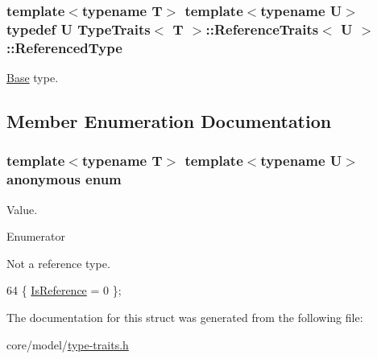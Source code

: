 \subsubsection[{\texorpdfstring{Referenced\+Type}{ReferencedType}}]{\setlength{\rightskip}{0pt plus 5cm}template$<$typename T$>$ template$<$typename U$>$ typedef U {\bf Type\+Traits}$<$ T $>$\+::{\bf Reference\+Traits}$<$ U $>$\+::{\bf Referenced\+Type}}\hypertarget{structTypeTraits_1_1ReferenceTraits_a163b9c89cfaba740659697cc1d1fea22}{}\label{structTypeTraits_1_1ReferenceTraits_a163b9c89cfaba740659697cc1d1fea22}
\hyperlink{structTypeTraits_1_1Base}{Base} type. 

\subsection{Member Enumeration Documentation}
\subsubsection[{\texorpdfstring{anonymous enum}{anonymous enum}}]{\setlength{\rightskip}{0pt plus 5cm}template$<$typename T$>$ template$<$typename U$>$ anonymous enum}\hypertarget{structTypeTraits_1_1ReferenceTraits_a2ca079e379bf0e0a66c93a97e9f4097d}{}\label{structTypeTraits_1_1ReferenceTraits_a2ca079e379bf0e0a66c93a97e9f4097d}
Value. \begin{Desc}
\item[Enumerator]\par
\begin{description}
\item[{\em 
Is\+Reference\hypertarget{structTypeTraits_1_1ReferenceTraits_a2ca079e379bf0e0a66c93a97e9f4097da833081f071bb2e66b80dee63c1611d26}{}\label{structTypeTraits_1_1ReferenceTraits_a2ca079e379bf0e0a66c93a97e9f4097da833081f071bb2e66b80dee63c1611d26}
}]Not a reference type. \end{description}
\end{Desc}

\begin{DoxyCode}
64 \{ \hyperlink{structTypeTraits_1_1ReferenceTraits_a2ca079e379bf0e0a66c93a97e9f4097da833081f071bb2e66b80dee63c1611d26}{IsReference} = 0          \};
\end{DoxyCode}


The documentation for this struct was generated from the following file\+:\begin{DoxyCompactItemize}
\item 
core/model/\hyperlink{type-traits_8h}{type-\/traits.\+h}\end{DoxyCompactItemize}
